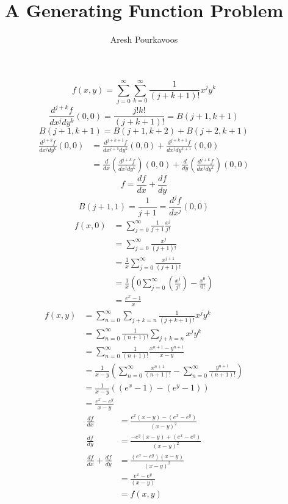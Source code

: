 \documentclass{article}
\begin{document}
\title{A Generating Function Problem}
\author{Aresh Pourkavoos}
\maketitle

\[f(x, y) = \sum_{j=0}^\infty\sum_{k=0}^\infty\frac{1}{(j+k+1)!}x^jy^k\]
\[\frac{d^{j+k}f}{dx^jdy^k}(0, 0) = \frac{j!k!}{(j+k+1)!} = B(j+1, k+1)\]
\[B(j+1, k+1) = B(j+1, k+2) + B(j+2, k+1)\]
\begin{align*}
  \frac{d^{j+k}f}{dx^jdy^k}(0, 0)
  &= \frac{d^{j+k+1}f}{dx^{j+1}dy^k}(0, 0)
  + \frac{d^{j+k+1}f}{dx^jdy^{k+1}}(0, 0) \\
  &= \frac{d}{dx}\left(\frac{d^{j+k}f}{dx^jdy^k}\right)(0, 0)
  + \frac{d}{dy}\left(\frac{d^{j+k}f}{dx^jdy^k}\right)(0, 0)
\end{align*}
\[f = \frac{df}{dx}+\frac{df}{dy}\]
\[B(j+1, 1) = \frac{1}{j+1} = \frac{d^jf}{dx^j}(0, 0)\]
\begin{align*}
  f(x, 0) &= \sum_{j=0}^\infty \frac{1}{j+1}\frac{x^j}{j!} \\
  &= \sum_{j=0}^\infty \frac{x^j}{(j+1)!} \\
  &= \frac{1}{x} \sum_{j=0}^\infty \frac{x^{j+1}}{(j+1)!} \\
  &= \frac{1}{x} \left(
  0\sum_{j=0}^\infty \left(\frac{x^j}{j!}\right)-\frac{x^0}{0!}
  \right) \\
  &= \frac{e^x-1}{x}
\end{align*}
\begin{align*}
  f(x, y) &= \sum_{n=0}^\infty\sum_{j+k=n}\frac{1}{(j+k+1)!}x^jy^k \\
  &= \sum_{n=0}^\infty\frac{1}{(n+1)!}\sum_{j+k=n}x^jy^k \\
  &= \sum_{n=0}^\infty\frac{1}{(n+1)!}\frac{x^{n+1}-y^{n+1}}{x-y} \\
  &= \frac{1}{x-y}\left(
  \sum_{n=0}^\infty\frac{x^{n+1}}{(n+1)!}-\sum_{n=0}^\infty\frac{y^{n+1}}{(n+1)!}
  \right) \\
  &= \frac{1}{x-y}((e^x-1)-(e^y-1)) \\
  &= \frac{e^x-e^y}{x-y}
\end{align*}
\begin{align*}
  \frac{df}{dx} &= \frac{e^x(x-y)-(e^x-e^y)}{(x-y)^2} \\
  \frac{df}{dy} &= \frac{-e^y(x-y)+(e^x-e^y)}{(x-y)^2} \\
  \frac{df}{dx}+\frac{df}{dy} &= \frac{(e^x-e^y)(x-y)}{(x-y)^2} \\
  &= \frac{e^x-e^y}{(x-y)} \\
  &= f(x, y)
\end{align*}
\end{document}
